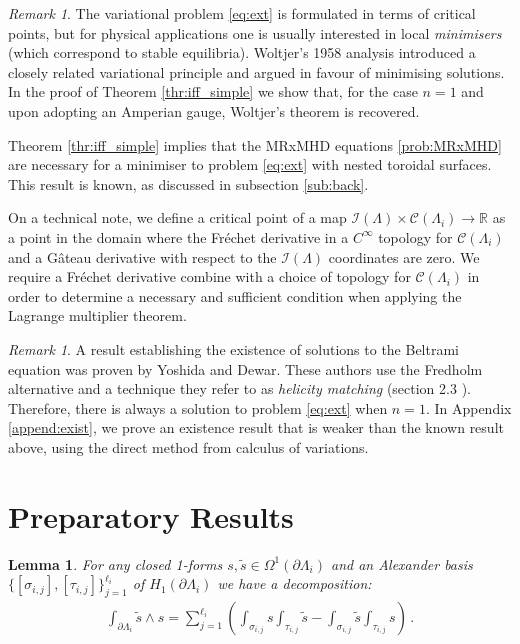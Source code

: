 \documentclass[11pt]{article}
\theoremstyle{plain}
\newtheorem{lemma}[theorem]{Lemma}
\theoremstyle{definition}
\theoremstyle{remark}
\newtheorem{remark}[theorem]{Remark}
\newcommand{\R}{\mathbb{R}}
\newcommand{\ST}{\Lambda}
\newcommand{\I}{\mathcal{I}(\ST)}
\begin{document}
\begin{remark}\label{remark:MHD}
  The variational problem \eqref{eq:ext} is formulated in terms of critical points, but for physical applications one is usually interested in local \emph{minimisers} (which correspond to stable equilibria). Woltjer's 1958 analysis introduced a closely related variational principle and argued in favour of minimising solutions. In the proof of Theorem \ref{thr:iff_simple} we show that, for the case \(n=1\) and upon adopting an Amperian gauge, Woltjer's theorem is recovered.
\end{remark}

Theorem \ref{thr:iff_simple} implies that the MRxMHD equations \eqref{prob:MRxMHD} are necessary for a minimiser to problem \eqref{eq:ext} with nested toroidal surfaces. This result is known, as discussed in subsection \ref{sub:back}. 

On a technical note, we define a critical point of a map \( \I \times  \mathcal{C} ( \ST_i) \to \R\) as a point in the domain where the Fréchet derivative in a \(C^\infty\) topology for \(\mathcal{C} ( \ST_i)\) and a Gâteau derivative with respect to the \(\I\) coordinates are zero. We require a Fr\'echet derivative combine with a choice of topology for \(\mathcal{C} ( \ST_i)\) in order to determine a necessary and sufficient condition when applying the Lagrange multiplier theorem. 


  \begin{remark}
    A result establishing the existence of solutions to the Beltrami equation was proven by Yoshida and Dewar. These authors use the Fredholm alternative and a technique they refer to as \textit{helicity matching} (section 2.3 \cite{yoshida2012helical}). Therefore, there is always a solution to problem \eqref{eq:ext} when \(n=1\). In Appendix \ref{append:exist}, we prove an existence result that is weaker than the known result above, using the direct method from calculus of variations.
 \end{remark}
    
    


\section{Preparatory Results}\label{section:Preparatory Results}


\begin{lemma}\label{Lemma:compute}
    For any closed 1-forms \(s, \tilde{s} \in \Omega^{1} (\partial \ST_i)\) and an Alexander basis \(\{[\sigma_{i,j}],[\tau_{i,j}]\}_{j=1}^{\ell_i}\) of \(H_1(\partial \ST_i)\) we have a decomposition:
    \begin{align}\label{eq:compute_2}
    \int_{\partial \ST_i} \tilde{s} \wedge s = \sum_{j=1}^{\ell_i}  \left(\int_{\sigma_{i,j}} \! s \int_{\tau_{i,j}}  \! \tilde{s} -\int_{\sigma_{i,j}}  \! \tilde{s}    \int_{\tau_{i,j}}  \! s   \right) 
     \, .
\end{align}
\end{lemma}
\end{document}
